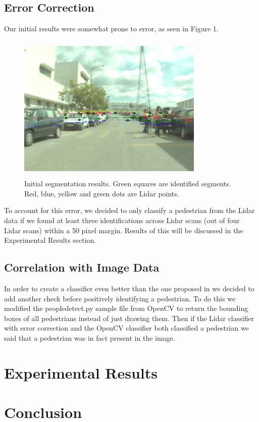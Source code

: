 \documentclass[10pt,twocolumn,letterpaper]{article}
\begin{document}
  \subsection{Error Correction}
  Our initial results were somewhat prone to error, as seen in Figure 1.
  \begin{figure}
    \includegraphics[height=2.8in, width=3.5in]{images/initial_result.png}
    \caption{ Initial segmentation results. Green squares are identified 
    segments. Red, blue, yellow and green dots are Lidar points.}
  \end{figure}

  To account for this error, we decided to only classify a pedestrian from the 
  Lidar data if we found at least three identifications across Lidar scans 
  (out of four Lidar scans) within a 50 pixel margin. Results of this will be 
  discussed in the Experimental Results section.

  \subsection{Correlation with Image Data}
  In order to create a classifier even better than the one proposed in 
  \cite{journal} we decided to add another check before positively identifying 
  a pedestrian. To do this we modified the peopledetect.py sample file from
  OpenCV \cite{opencv} to return the bounding boxes of all pedestrians instead
  of just drawing them. Then if the Lidar classifier with error correction and 
  the OpenCV classifier both classified a pedestrian we said that a pedestrian
  was in fact present in the image.


\section{Experimental Results}


\section{Conclusion}



{\small


}
\end{document}
